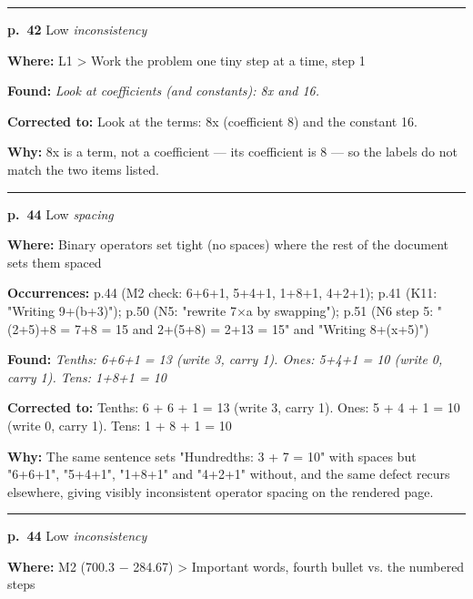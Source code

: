 \documentclass[11pt]{article}
\newcommand{\sevlow}[1]{\textcolor{black!55}{#1}}
\begin{document}
\noindent\rule{\textwidth}{0.4pt}\par\nobreak\vspace{2pt}
\noindent\textbf{p.~42} \quad \sevlow{Low} \quad \textit{inconsistency}\par
\noindent\textbf{Where: }L1 > Work the problem one tiny step at a time, step 1\par
\noindent\textbf{Found: }\textit{Look at coefficients (and constants): 8x and 16.}\par
\noindent\textbf{Corrected to: }Look at the terms: 8x (coefficient 8) and the constant 16.\par
\noindent\textbf{Why: }8x is a term, not a coefficient --- its coefficient is 8 --- so the labels do not match the two items listed.\par\vspace{4pt}
\noindent\rule{\textwidth}{0.4pt}\par\nobreak\vspace{2pt}
\noindent\textbf{p.~44} \quad \sevlow{Low} \quad \textit{spacing}\par
\noindent\textbf{Where: }Binary operators set tight (no spaces) where the rest of the document sets them spaced\par
\noindent\textbf{Occurrences: }p.44 (M2 check: 6+6+1, 5+4+1, 1+8+1, 4+2+1); p.41 (K11: "Writing 9+(b+3)"); p.50 (N5: "rewrite 7$\times$a by swapping"); p.51 (N6 step 5: "(2+5)+8 = 7+8 = 15 and 2+(5+8) = 2+13 = 15" and "Writing 8+(x+5)")\par
\noindent\textbf{Found: }\textit{Tenths: 6+6+1 = 13 (write 3, carry 1). Ones: 5+4+1 = 10 (write 0, carry 1). Tens: 1+8+1 = 10}\par
\noindent\textbf{Corrected to: }Tenths: 6 + 6 + 1 = 13 (write 3, carry 1). Ones: 5 + 4 + 1 = 10 (write 0, carry 1). Tens: 1 + 8 + 1 = 10\par
\noindent\textbf{Why: }The same sentence sets "Hundredths: 3 + 7 = 10" with spaces but "6+6+1", "5+4+1", "1+8+1" and "4+2+1" without, and the same defect recurs elsewhere, giving visibly inconsistent operator spacing on the rendered page.\par\vspace{4pt}
\noindent\rule{\textwidth}{0.4pt}\par\nobreak\vspace{2pt}
\noindent\textbf{p.~44} \quad \sevlow{Low} \quad \textit{inconsistency}\par
\noindent\textbf{Where: }M2 (700.3 $-$ 284.67) > Important words, fourth bullet vs. the numbered steps\par
\end{document}
